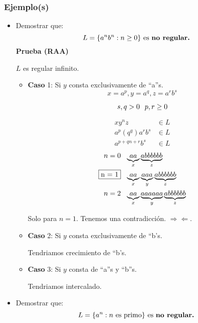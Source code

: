 \subsubsection{Ejemplo(s)}
\begin{itemize}
\item Demostrar que:
	$$
	L =\{ a^n b^n : n\geq 0 \} \text{ es \textbf{no regular.}}
	$$
\textbf{Prueba (RAA)}	
\begin{center}
$L$ es regular infinito.
\end{center}
\begin{itemize}
\item \textbf{Caso} 1: Si $y$ consta exclusivamente de ``a''s.
$$
	x=a^p , y=a^q , z=a^r b^s
$$

$$
	s,q >0 \hspace{0.25cm} p,r\geq 0
$$
\begin{multicols}{2}
\begin{align*}
xy^n z & \in L \\
a^p(q^q)a^r b^s & \in L \\
a^{p+qn+r} b^s & \in L
\end{align*}
\columnbreak
\begin{align*}
n = 0 & \hspace{0.25cm} \underbrace{aa}_x \underbrace{abbbbbb}_z \\
\fbox{n = 1} & \hspace{0.25cm} \underbrace{aa}_x \underbrace{aaa}_y \underbrace{abbbbbb}_z \\
n = 2 & \hspace{0.25cm} \underbrace{aa}_x \underbrace{aaaaaa}_y \underbrace{abbbbbb}_z
\end{align*}
\end{multicols}

Solo para $n=1$. Tenemos una contradicción. $\Rightarrow\Leftarrow$.



\item \textbf{Caso} 2: Si $y$ consta exclusivamente de ``b's.
\begin{center}
Tendriamos crecimiento de ``b's.
\end{center}
\item \textbf{Caso} 3: Si $y$ consta de ``a''s y ``b''s.
\begin{center}
Tendriamos intercalado.
\end{center}

\end{itemize}
\item Demostrar que:
	$$
	L =\{ a^n : n \text{ es primo} \} \text{ es \textbf{no regular.}}
	$$
\end{itemize}
